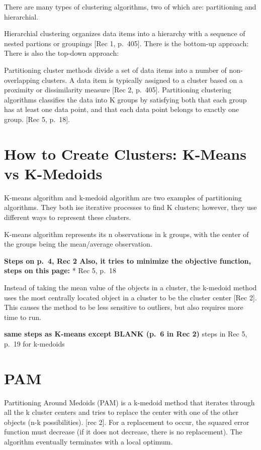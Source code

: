 \documentclass[12pt,twoside]{amherstthesis}
\begin{document}
  There are many types of clustering algorithms, two of which are:
  partitioning and hierarchial.
  
  Hierarchial clustering organizes data items into a hierarchy with a
  sequence of nested partions or groupings {[}Rec 1, p.~405{]}. There is
  the bottom-up approach: There is also the top-down approach:
  
  Partitioning cluster methods divide a set of data items into a number of
  non-overlapping clusters. A data item is typically assigned to a cluster
  based on a proximity or dissimilarity measure {[}Rec 2, p.~405{]}.
  Partitioning clustering algorithms classifies the data into K groups by
  satisfying both that each group has at least one data point, and that
  each data point belongs to exactly one group. {[}Rec 5, p.~18{]}.
  
  \section{How to Create Clusters: K-Means vs
  K-Medoids}\label{how-to-create-clusters-k-means-vs-k-medoids}
  
  K-means algorithm and k-medoid algorithm are two examples of
  partitioning algorithms. They both ise iterative processes to find K
  clusters; however, they use different ways to represent these clusters.
  
  K-means algorithm represents its n observations in k groups, with the
  center of the groups being the mean/average observation.
  
  \textbf{Steps on p.~4, Rec 2 Also, it tries to minimize the objective
  function, steps on this page: }* Rec 5, p.~18
  
  Instead of taking the mean value of the objects in a cluster, the
  k-medoid method uses the most centrally located object in a cluster to
  be the cluster center {[}Rec 2{]}. This causes the method to be less
  sensitive to outliers, but also requires more time to run.
  
  \textbf{same steps as K-means except BLANK (p.~6 in Rec 2) }steps in Rec
  5, p.~19 for k-medoids
  
  \section{PAM}\label{pam}
  
  Partitioning Around Medoids (PAM) is a k-medoid method that iterates
  through all the k cluster centers and tries to replace the center with
  one of the other objects (n-k possibilities). {[}rec 2{]}. For a
  replacement to occur, the squared error function must decrease (if it
  does not decrease, there is no replacement). The algorithm eventually
  terminates with a local optimum.
  
\end{document}

